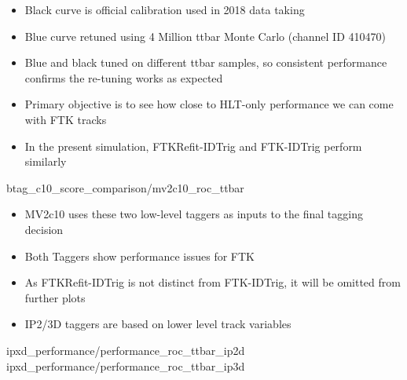     { \begin{itemize}
        \item Black curve is official calibration used in 2018 data taking
        \item Blue curve retuned using 4 Million ttbar Monte Carlo (channel ID 410470)
        \item Blue and black tuned on different ttbar samples,
            so consistent performance confirms the re-tuning works as expected
        \item Primary objective is to see how close to 
            HLT-only performance we can come with FTK tracks
        \item In the present simulation, FTKRefit-IDTrig and FTK-IDTrig perform similarly
    \end{itemize} }
    {btag_c10_score_comparison/mv2c10_roc_ttbar}

    { \begin{itemize}
        \item MV2c10 uses these two low-level taggers as inputs to the final tagging decision
        \item Both Taggers show performance issues for FTK
        \item As FTKRefit-IDTrig is not distinct from FTK-IDTrig,
            it will be omitted from further plots
        \item IP2/3D taggers are based on lower level track variables 
    \end{itemize} }
    {ipxd_performance/performance_roc_ttbar_ip2d}
    {ipxd_performance/performance_roc_ttbar_ip3d}
